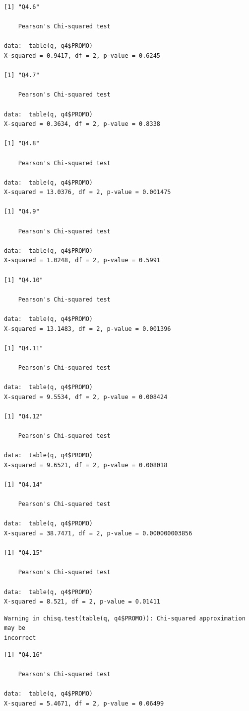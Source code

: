 \documentclass[]{article}
\begin{document}
\begin{verbatim}
[1] "Q4.6"

    Pearson's Chi-squared test

data:  table(q, q4$PROMO)
X-squared = 0.9417, df = 2, p-value = 0.6245

[1] "Q4.7"

    Pearson's Chi-squared test

data:  table(q, q4$PROMO)
X-squared = 0.3634, df = 2, p-value = 0.8338

[1] "Q4.8"

    Pearson's Chi-squared test

data:  table(q, q4$PROMO)
X-squared = 13.0376, df = 2, p-value = 0.001475

[1] "Q4.9"

    Pearson's Chi-squared test

data:  table(q, q4$PROMO)
X-squared = 1.0248, df = 2, p-value = 0.5991

[1] "Q4.10"

    Pearson's Chi-squared test

data:  table(q, q4$PROMO)
X-squared = 13.1483, df = 2, p-value = 0.001396

[1] "Q4.11"

    Pearson's Chi-squared test

data:  table(q, q4$PROMO)
X-squared = 9.5534, df = 2, p-value = 0.008424

[1] "Q4.12"

    Pearson's Chi-squared test

data:  table(q, q4$PROMO)
X-squared = 9.6521, df = 2, p-value = 0.008018

[1] "Q4.14"

    Pearson's Chi-squared test

data:  table(q, q4$PROMO)
X-squared = 38.7471, df = 2, p-value = 0.000000003856

[1] "Q4.15"

    Pearson's Chi-squared test

data:  table(q, q4$PROMO)
X-squared = 8.521, df = 2, p-value = 0.01411
\end{verbatim}

\begin{verbatim}
Warning in chisq.test(table(q, q4$PROMO)): Chi-squared approximation may be
incorrect
\end{verbatim}

\begin{verbatim}
[1] "Q4.16"

    Pearson's Chi-squared test

data:  table(q, q4$PROMO)
X-squared = 5.4671, df = 2, p-value = 0.06499
\end{verbatim}
\end{document}
